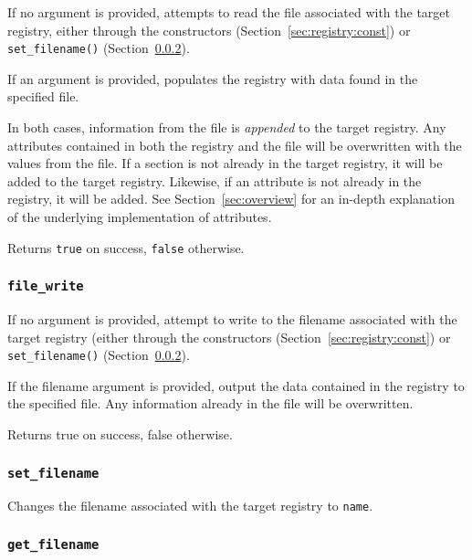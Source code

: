 
If no argument is provided, attempts to read the file associated with
the target registry, either through the constructors
(Section~\ref{sec:registry:const}) or {\tt set\_filename()}
(Section~\ref{sec:registry:set_filename}).

If an argument is provided, populates the registry with data found in
the specified file.

In both cases, information from the file is {\em appended} to the
target registry.  Any attributes contained in both the registry and
the file will be overwritten with the values from the file.  If a
section is not already in the target registry, it will be added to the
target registry.  Likewise, if an attribute is not already in the
registry, it will be added.  See Section~\ref{sec:overview} for an in-depth
explanation of the underlying implementation of attributes.

Returns {\tt true} on success, {\tt false} otherwise.

\subsubsection[file\_write]{{\tt file\_write}}


If no argument is provided, attempt to write to the filename
associated with the target registry (either through the constructors
(Section~\ref{sec:registry:const}) or {\tt set\_filename()}
(Section~\ref{sec:registry:set_filename}).

If the filename argument is provided, output the data contained in the
registry to the specified file.  Any information already in the file
will be overwritten.

Returns true on success, false otherwise.

\subsubsection[set\_filename]{{\tt set\_filename}}
\label{sec:registry:set_filename}


Changes the filename associated with the target registry to {\tt name}.


\subsubsection[get\_filename]{{\tt get\_filename}}
\label{sec:registry:get_filename}

